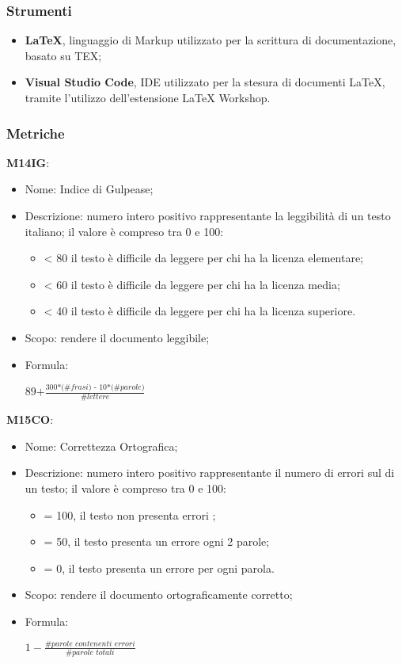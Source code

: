 \subsubsection{Strumenti}
\begin{itemize}
  \item \textbf{LaTeX}, linguaggio di Markup utilizzato per la scrittura di documentazione, basato su TEX;
  \item \textbf{Visual Studio Code}, IDE utilizzato per la stesura di documenti LaTeX, tramite l'utilizzo dell'estensione LaTeX Workshop.
\end{itemize}

\subsubsection{Metriche}
\textbf{M14IG}:
  \begin{itemize}
    \item Nome: Indice di Gulpease;
    \item Descrizione: numero intero positivo rappresentante la leggibilità di un testo italiano; il valore è compreso tra 0 e 100:
      \begin{itemize}
        \item < 80 il testo è difficile da leggere per chi ha la licenza elementare;
        \item < 60 il testo è difficile da leggere per chi ha la licenza media;
        \item < 40 il testo è difficile da leggere per chi ha la licenza superiore.
      \end{itemize}
    \item Scopo: rendere il documento leggibile;
    \item Formula:
    \begin{center}
    $ \textit{89+}\frac{\textit{300*(\#frasi) - 10*(\#parole)}}{\textit{\#lettere}}$
    \end{center}
  \end{itemize}
\textbf{M15CO}:
  \begin{itemize}
    \item Nome: Correttezza Ortografica;
    \item Descrizione: numero intero positivo rappresentante il numero di errori sul di un testo; il valore è compreso tra 0 e 100:
      \begin{itemize}
        \item = 100, il testo non presenta errori ;
        \item = 50, il testo presenta un errore ogni 2 parole;
        \item = 0, il testo presenta un errore per ogni parola.
      \end{itemize}
    \item Scopo: rendere il documento ortograficamente corretto;
    \item Formula:
    \begin{center}
      $ 1 - \frac{\textit{\#parole contenenti errori}}{\textit{\#parole totali}}$
    \end{center}

  \end{itemize}